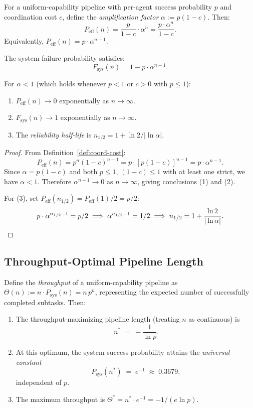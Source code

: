 \begin{theorem}
\label{thm:error-amp}
For a uniform-capability pipeline with per-agent success probability $p$ and
coordination cost $c$, define the \emph{amplification factor} $\alpha := p(1-c)$.
Then:
\[
  P_{\mathrm{eff}}(n) = \frac{p}{1-c} \cdot \alpha^n = \frac{p \cdot \alpha^n}{1-c}.
\]
Equivalently, $P_{\mathrm{eff}}(n) = p \cdot \alpha^{n-1}$.

The system failure probability satisfies:
\[
  F_{\mathrm{sys}}(n) = 1 - p \cdot \alpha^{n-1}.
\]

For $\alpha < 1$ (which holds whenever $p < 1$ or $c > 0$ with $p \leq 1$):
\begin{enumerate}
  \item $P_{\mathrm{eff}}(n) \to 0$ exponentially as $n \to \infty$.
  \item $F_{\mathrm{sys}}(n) \to 1$ exponentially as $n \to \infty$.
  \item The \emph{reliability half-life} is $n_{1/2} = 1 + \ln 2 / |\ln \alpha|$.
\end{enumerate}
\end{theorem}

\begin{proof}
From Definition~\ref{def:coord-cost}:
\[
  P_{\mathrm{eff}}(n) = p^n (1-c)^{n-1} = p \cdot [p(1-c)]^{n-1} = p \cdot \alpha^{n-1}.
\]
Since $\alpha = p(1-c)$ and both $p \leq 1$, $(1-c) \leq 1$ with at least one strict,
we have $\alpha < 1$. Therefore $\alpha^{n-1} \to 0$ as $n \to \infty$, giving
conclusions (1) and (2).

For (3), set $P_{\mathrm{eff}}(n_{1/2}) = P_{\mathrm{eff}}(1)/2 = p/2$:
\[
  p \cdot \alpha^{n_{1/2}-1} = p/2
  \;\Longrightarrow\;
  \alpha^{n_{1/2}-1} = 1/2
  \;\Longrightarrow\;
  n_{1/2} = 1 + \frac{\ln 2}{|\ln \alpha|}.
  \qedhere
\]
\end{proof}

\subsection{Throughput-Optimal Pipeline Length}

\begin{theorem}
\label{thm:throughput-optimum}
Define the \emph{throughput} of a uniform-capability pipeline as $\Theta(n) := n \cdot P_{\mathrm{sys}}(n) = n \, p^n$,
representing the expected number of successfully completed subtasks. Then:
\begin{enumerate}
  \item The throughput-maximizing pipeline length (treating $n$ as continuous) is
  \[
    n^* \;=\; -\frac{1}{\ln p}.
  \]
  \item At this optimum, the system success probability attains the \emph{universal constant}
  \[
    P_{\mathrm{sys}}(n^*) \;=\; e^{-1} \;\approx\; 0.3679,
  \]
  independent of $p$.
  \item The maximum throughput is $\Theta^* = n^* \cdot e^{-1} = -1/(e \ln p)$.
\end{enumerate}
\end{theorem}

